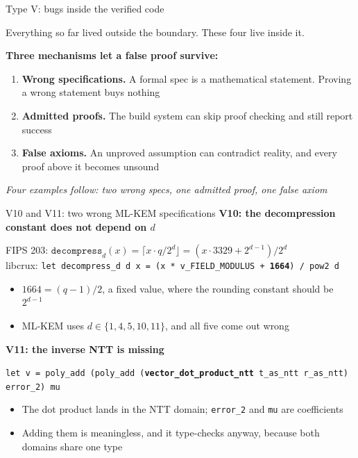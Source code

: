 \ifdefined\PRESENTATION\else\PassOptionsToClass{handout}{beamer}\fi\documentclass[aspectratio=169, lualatex]{beamer}
\begin{document}
\begin{frame}{Type V: bugs inside the verified code}
	\begin{center}
		\Large
		Everything so far lived outside the boundary. These four live inside it.
	\end{center}
	\vspace{0.4em}
	\textbf{Three mechanisms let a false proof survive:}
	\begin{enumerate}
		\item \textbf{Wrong specifications.} A formal spec is a mathematical statement. Proving a wrong statement buys nothing
		\item \textbf{Admitted proofs.} The build system can skip proof checking and still report success
		\item \textbf{False axioms.} An unproved assumption can contradict reality, and every proof above it becomes unsound
	\end{enumerate}
	\vspace{0.5em}
	\begin{center}
		\textit{Four examples follow: two wrong specs, one admitted proof, one false axiom}
	\end{center}
\end{frame}

\begin{frame}{V10 and V11: two wrong ML-KEM specifications}
	\textbf{V10: the decompression constant does not depend on $d$}
	\begin{flushleft}
		FIPS 203: $\mathtt{decompress}_d(x) = \lceil x \cdot q / 2^d \rfloor = (x \cdot 3329 + 2^{d-1}) / 2^d$\\
		libcrux: \texttt{let decompress\_d d x = (x * v\_FIELD\_MODULUS + \textbf{1664}) / pow2 d}
	\end{flushleft}
	\begin{itemize}
		\item $1664 = (q-1)/2$, a fixed value, where the rounding constant should be $2^{d-1}$
		\item ML-KEM uses $d \in \{1, 4, 5, 10, 11\}$, and all five come out wrong
	\end{itemize}
	\vspace{0.4em}
	\textbf{V11: the inverse NTT is missing}
	\begin{flushleft}
		\texttt{let v = poly\_add (poly\_add (\textbf{vector\_dot\_product\_ntt} t\_as\_ntt r\_as\_ntt) error\_2) mu}
	\end{flushleft}
	\begin{itemize}
		\item The dot product lands in the NTT domain; \texttt{error\_2} and \texttt{mu} are coefficients
		\item Adding them is meaningless, and it type-checks anyway, because both domains share one type
	\end{itemize}
\end{frame}
\end{document}

